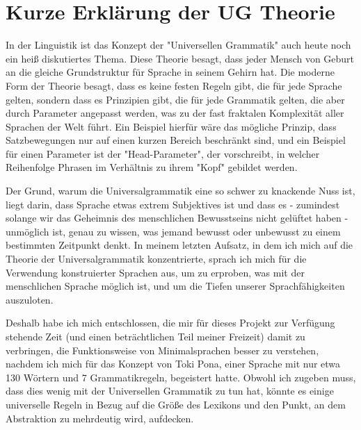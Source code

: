 \documentclass{article}
\begin{document}
\section{Kurze Erklärung der UG Theorie}
In der Linguistik ist das Konzept der "Universellen Grammatik" auch heute noch ein heiß diskutiertes Thema.
Diese Theorie besagt, dass jeder Mensch von Geburt an die gleiche Grundstruktur für Sprache in seinem Gehirn hat.
Die moderne Form der Theorie besagt, dass es keine festen Regeln gibt, die für jede Sprache gelten,
sondern dass es Prinzipien gibt, die für jede Grammatik gelten, die aber durch Parameter angepasst werden,
was zu der fast fraktalen Komplexität aller Sprachen der Welt führt. Ein Beispiel hierfür wäre das mögliche Prinzip,
dass Satzbewegungen nur auf einen kurzen Bereich beschränkt sind, und ein Beispiel für einen Parameter ist der "Head-Parameter",
der vorschreibt, in welcher Reihenfolge Phrasen im Verhältnis zu ihrem "Kopf" gebildet werden.\cite{ChUGAI}

Der Grund, warum die Universalgrammatik eine so schwer zu knackende Nuss ist, liegt darin, dass Sprache etwas extrem Subjektives
ist und dass es - zumindest solange wir das Geheimnis des menschlichen Bewusstseins nicht gelüftet haben - unmöglich ist,
genau zu wissen, was jemand bewusst oder unbewusst zu einem bestimmten Zeitpunkt denkt. In meinem letzten Aufsatz,
in dem ich mich auf die Theorie der Universalgrammatik konzentrierte, sprach ich mich für die Verwendung konstruierter Sprachen aus,
um zu erproben, was mit der menschlichen Sprache möglich ist, und um die Tiefen unserer Sprachfähigkeiten auszuloten.

Deshalb habe ich mich entschlossen, die mir für dieses Projekt zur Verfügung stehende Zeit (und einen beträchtlichen
Teil meiner Freizeit) damit zu verbringen, die Funktionsweise von Minimalsprachen besser zu verstehen,
nachdem ich mich für das Konzept von Toki Pona, einer Sprache mit nur etwa 130 Wörtern und 7 Grammatikregeln\cite{Lang14},
begeistert hatte. Obwohl ich zugeben muss, dass dies wenig mit der Universellen Grammatik zu tun hat,
könnte es einige universelle Regeln in Bezug auf die Größe des Lexikons und den Punkt,
an dem Abstraktion zu mehrdeutig wird, aufdecken.
\end{document}
